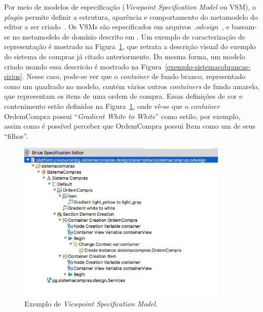 Por meio de modelos de especificação (\textit{Viewpoint Specification Model} ou VSM), o \textit{plugin} permite definir a estrutura, aparência e comportamento do metamodelo do editor a ser criado~\cite{viyovic2014sirius}. Os VSMs são especificados em arquivos \textit{.odesign}~\cite{viyovic2014sirius}, e baseam-se no metamodelo de domínio descrito em \ecore. Um exemplo de caracterização de representação é mostrado na Figura~\ref{exemplo-sirius}, que retrata a descrição visual do exemplo do sistema de compras já citado anteriormente. Da mesma forma, um modelo criado usando essa descricão é mostrado na Figura~\ref{exemplo-sistemacobrancas-sirius}. Nesse caso, pode-se ver que o \textit{container} de fundo branco, representado como um quadrado no modelo, contém vários outros \textit{containers} de fundo amarelo, que representam os itens de uma ordem de compra. Essas definições de cor e contenimento estão definidas na Figura~\ref{exemplo-sirius}, onde vê-se que o \textit{container} OrdemCompra possui ``\textit{Gradient White to White}'' como estilo, por exemplo, assim como é possível perceber que OrdemCompra possui Item como um de seus ``filhos''.


\begin{figure}
	\centering
	\includegraphics[width=0.9\textwidth]{figuras/exemplos-emf/exemplo-sirius-vsm.png}
	\caption{Exemplo de \textit{Viewpoint Specification Model}.}
	\label{exemplo-sirius}
\end{figure}

